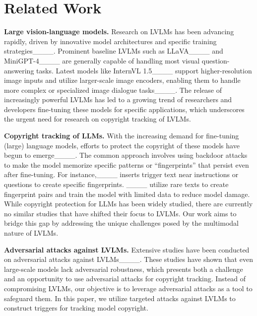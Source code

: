\section{Related Work}
\textbf{Large vision-language models.} Research on LVLMs has been advancing rapidly, driven by innovative model architectures and specific training strategies____. Prominent baseline LVLMs such as LLaVA____ and MiniGPT-4____ are generally capable of handling most visual question-answering tasks. Latest models like InternVL 1.5____ support higher-resolution image inputs and utilize larger-scale image encoders, enabling them to handle more complex or specialized image dialogue tasks____. The release of increasingly powerful LVLMs has led to a growing trend of researchers and developers fine-tuning these models for specific applications, which underscores the urgent need for research on copyright tracking of LVLMs.

\textbf{Copyright tracking of LLMs.} With the increasing demand for fine-tuning (large) language models, efforts to protect the copyright of these models have begun to emerge____. The common approach involves using backdoor attacks to make the model memorize specific patterns or ``fingerprints'' that persist even after fine-tuning. For instance,____ inserts trigger text near instructions or questions to create specific fingerprints. ____ utilize rare texts to create fingerprint pairs and train the model with limited data to reduce model damage. While copyright protection for LLMs has been widely studied, there are currently no similar studies that have shifted their focus to LVLMs. Our work aims to bridge this gap by addressing the unique challenges posed by the multimodal nature of LVLMs.

\textbf{Adversarial attacks against LVLMs.} Extensive studies have been conducted on adversarial attacks against LVLMs____. These studies have shown that even large-scale models lack adversarial robustness, which presents both a challenge and an opportunity to use adversarial attacks for copyright tracking. Instead of compromising LVLMs, our objective is
to leverage adversarial attacks as a tool to safeguard them. In this paper, we utilize targeted attacks against LVLMs to construct triggers for tracking model copyright.


%
